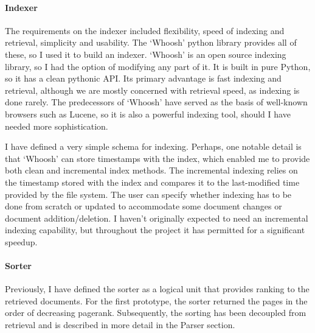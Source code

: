 \documentclass[12pt,twoside,notitlepage]{report}
\begin{document}
\paragraph{Indexer}

The requirements on the indexer included flexibility, speed of indexing and
retrieval, simplicity and usability.  The `Whoosh' python library provides all
of these, so I used it to build an indexer. `Whoosh' is an open source indexing
library, so I had the option of modifying any part of it. It is  built in pure
Python, so it has a clean pythonic API. Its primary advantage is fast indexing
and retrieval, although we are mostly concerned with retrieval speed, as
indexing is done rarely. The predecessors of `Whoosh' have served as the basis
of well-known browsers such as Lucene, so it is also a powerful indexing tool,
should I have needed more sophistication.

I have defined a very simple schema for indexing. Perhaps, one notable detail
is that `Whoosh' can store timestamps with the index, which enabled me to
provide both clean and incremental index methods. The incremental indexing
relies on the timestamp stored with the index and compares it to the
last-modified time provided by the file system. The user can specify whether
indexing has to be done from scratch or updated to accommodate some document
changes or document addition/deletion. I haven't originally expected to need an
incremental indexing capability, but throughout the project it has permitted
for a significant speedup.

\paragraph{Sorter}
Previously, I have defined the sorter as a logical unit that provides ranking to the
retrieved documents. For the first prototype, the sorter returned the pages in
the order of decreasing pagerank.
Subsequently, the sorting has been decoupled from retrieval and is described in
more detail in the Parser section.
\end{document}
